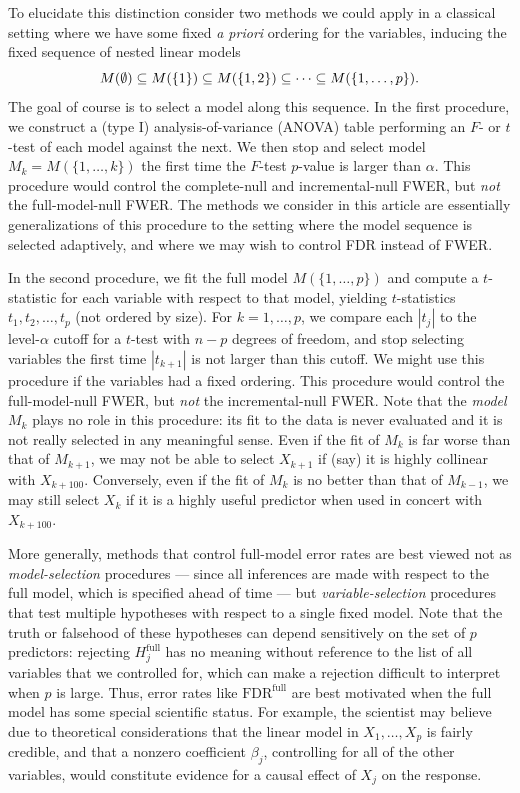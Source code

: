 \documentclass{article}
\begin{document}
To elucidate this distinction consider two methods we could apply in a classical setting where we have some fixed {\em a priori} ordering for the variables, inducing the fixed sequence of nested linear models
\[
M(\emptyset) \subseteq M(\{1\}) \subseteq M(\{1,2\}) \subseteq \cdots \subseteq M(\{1,\ldots, p\}).
\]
The goal of course is to select a model along this sequence. In the first procedure, we construct a (type I) analysis-of-variance (ANOVA) table performing an $F$- or $t$-test of each model against the next. We then stop and select model $M_k=M(\{1,\ldots,k\})$ the first time the $F$-test $p$-value is larger than $\alpha$. This procedure would control the complete-null and incremental-null FWER, but {\em not} the full-model-null FWER. The methods we consider in this article are essentially generalizations of this procedure to the setting where the model sequence is selected adaptively, and where we may wish to control FDR instead of FWER.

In the second procedure, we fit the full model $M(\{1,\ldots,p\})$ and compute a $t$-statistic for each variable with respect to that model, yielding $t$-statistics $t_1, t_2, \ldots, t_p$ (not ordered by size). For $k=1,\ldots,p$, we compare each $|t_j|$ to the level-$\alpha$ cutoff for a $t$-test with $n-p$ degrees of freedom, and stop selecting variables the first time $|t_{k+1}|$ is not larger than this cutoff. We might use this procedure if the variables had a  fixed ordering.
This procedure would control the full-model-null FWER, but {\em not} the incremental-null FWER. Note that the {\em model} $M_k$ plays no role in this procedure: its fit to the data is never evaluated and it is not really selected in any meaningful sense. Even if the fit of $M_k$ is far worse than that of $M_{k+1}$, we may not be able to select $X_{k+1}$ if (say) it is highly collinear with $X_{k+100}$. Conversely, even if the fit of $M_k$ is no better than that of $M_{k-1}$, we may still select $X_k$ if it is a highly useful predictor when used in concert with $X_{k+100}$.

More generally, methods that control full-model error rates are best viewed not as {\em model-selection} procedures --- since all inferences are made with respect to the full model, which is specified ahead of time --- but {\em variable-selection} procedures that test multiple hypotheses with respect to a single fixed model. Note that the truth or falsehood of these hypotheses can depend sensitively on the set of $p$ predictors: rejecting $H_j^{\text{full}}$ has no meaning without reference to the list of all variables that we controlled for, which can make a rejection difficult to interpret when $p$ is large. Thus, error rates like $\text{FDR}^{\text{full}}$ are best motivated when the full model has some special scientific status. For example, the scientist may believe due to theoretical considerations that the linear model in $X_1,\ldots,X_p$ is fairly credible, and that a nonzero coefficient $\beta_j$, controlling for all of the other variables, would constitute evidence for a causal effect of $X_j$ on the response.
\end{document}
